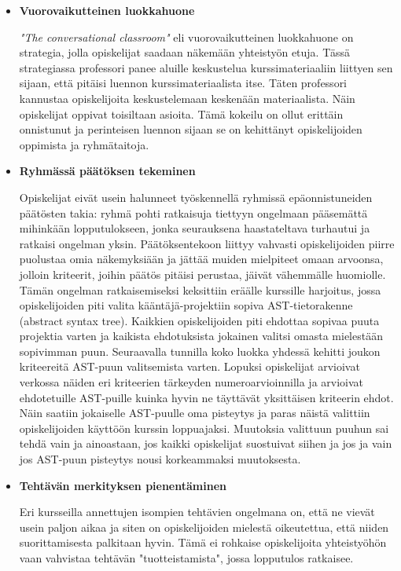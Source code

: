 \documentclass[finnish]{../tktltiki2}
\theoremstyle{definition}
\theoremstyle{remark}
\begin{document}
\begin{itemize}

\item {\bf Vuorovaikutteinen luokkahuone}

\emph{"The conversational classroom"} eli vuorovaikutteinen luokkahuone  on strategia, jolla opiskelijat saadaan näkemään yhteistyön etuja. Tässä strategiassa professori panee aluille keskustelua kurssimateriaaliin liittyen sen sijaan, että pitäisi luennon kurssimateriaalista itse. Täten professori kannustaa opiskelijoita keskustelemaan keskenään materiaalista. Näin opiskelijat oppivat toisiltaan asioita. Tämä kokeilu on ollut erittäin onnistunut ja perinteisen luennon sijaan se on kehittänyt opiskelijoiden oppimista ja ryhmätaitoja.

\item {\bf Ryhmässä päätöksen tekeminen}

Opiskelijat eivät usein halunneet työskennellä ryhmissä epäonnistunei\-den päätösten takia: ryhmä pohti ratkaisuja tiettyyn ongelmaan pääse\-mättä mihinkään lopputulokseen, jonka seurauksena haastateltava turhautui ja ratkaisi ongelman yksin. Päätöksentekoon liittyy vahvasti opiskelijoiden piirre puolustaa omia näkemyksiään ja jättää muiden mielpiteet omaan arvoonsa, jolloin kriteerit, joihin päätös pitäisi perustaa, jäivät vähemmälle huomiolle.\\

Tämän ongelman ratkaisemiseksi keksittiin eräälle kurssille harjoitus, jossa opiskelijoiden piti valita kääntäjä-projektiin sopiva AST-tietorakenne (abstract syntax tree). Kaikkien opiskelijoiden piti ehdottaa sopivaa puuta projektia varten ja kaikista ehdotuksista jokainen valitsi omasta mielestään sopivimman puun. Seuraavalla tunnilla koko luokka yhdessä kehitti joukon kriteereitä AST-puun valitsemista varten. Lopuksi opiskelijat arvioivat verkossa näiden eri kriteerien tärkeyden numeroarvioinnilla ja arvioivat ehdotetuille AST-puille kuinka hyvin ne täyttävät yksittäisen kriteerin ehdot. Näin saatiin jokaiselle AST-puulle oma pisteytys ja paras näistä valittiin opiskelijoiden käyttöön kurssin loppuajaksi. Muutoksia valittuun puuhun sai tehdä vain ja ainoastaan, jos kaikki opiskelijat suostuivat siihen ja jos ja vain jos AST-puun pisteytys nousi korkeammaksi muutoksesta.

\item {\bf Tehtävän merkityksen pienentäminen}

Eri kursseilla annettujen isompien tehtävien ongelmana on, että ne vievät usein paljon aikaa ja siten on opiskelijoiden mielestä oikeutettua, että niiden suorittamisesta palkitaan hyvin. Tämä ei rohkaise opiskelijoita yhteistyöhön vaan vahvistaa tehtävän "tuotteistamista", jossa lopputulos ratkaisee.\\


\end{itemize}
\end{document}
